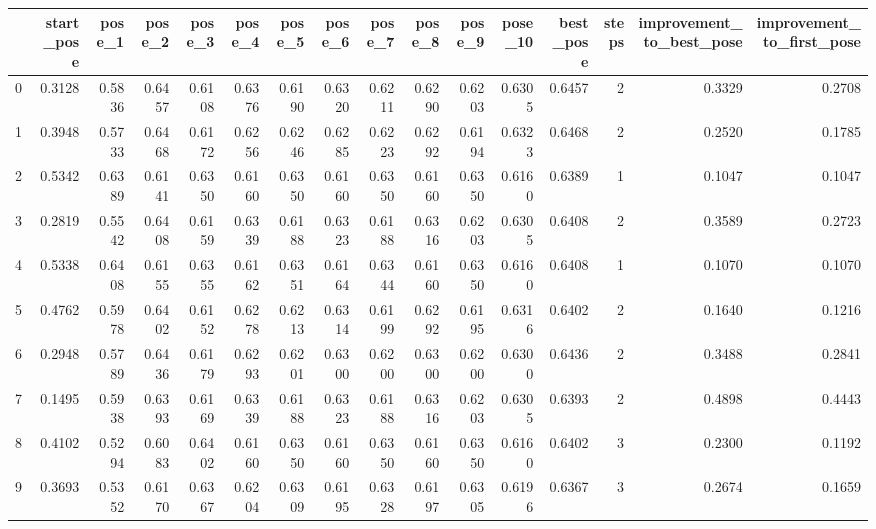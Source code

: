 \begin{tabular}{lrrrrrrrrrrrrrrr}
\toprule
{} &  start\_pose &  pose\_1 &  pose\_2 &  pose\_3 &  pose\_4 &  pose\_5 &  pose\_6 &  pose\_7 &  pose\_8 &  pose\_9 &  pose\_10 &  best\_pose &  steps &  improvement\_to\_best\_pose &  improvement\_to\_first\_pose \\
\midrule
0   &      0.3128 &  0.5836 &  0.6457 &  0.6108 &  0.6376 &  0.6190 &  0.6320 &  0.6211 &  0.6290 &  0.6203 &   0.6305 &     0.6457 &      2 &                    0.3329 &                     0.2708 \\
1   &      0.3948 &  0.5733 &  0.6468 &  0.6172 &  0.6256 &  0.6246 &  0.6285 &  0.6223 &  0.6292 &  0.6194 &   0.6323 &     0.6468 &      2 &                    0.2520 &                     0.1785 \\
2   &      0.5342 &  0.6389 &  0.6141 &  0.6350 &  0.6160 &  0.6350 &  0.6160 &  0.6350 &  0.6160 &  0.6350 &   0.6160 &     0.6389 &      1 &                    0.1047 &                     0.1047 \\
3   &      0.2819 &  0.5542 &  0.6408 &  0.6159 &  0.6339 &  0.6188 &  0.6323 &  0.6188 &  0.6316 &  0.6203 &   0.6305 &     0.6408 &      2 &                    0.3589 &                     0.2723 \\
4   &      0.5338 &  0.6408 &  0.6155 &  0.6355 &  0.6162 &  0.6351 &  0.6164 &  0.6344 &  0.6160 &  0.6350 &   0.6160 &     0.6408 &      1 &                    0.1070 &                     0.1070 \\
5   &      0.4762 &  0.5978 &  0.6402 &  0.6152 &  0.6278 &  0.6213 &  0.6314 &  0.6199 &  0.6292 &  0.6195 &   0.6316 &     0.6402 &      2 &                    0.1640 &                     0.1216 \\
6   &      0.2948 &  0.5789 &  0.6436 &  0.6179 &  0.6293 &  0.6201 &  0.6300 &  0.6200 &  0.6300 &  0.6200 &   0.6300 &     0.6436 &      2 &                    0.3488 &                     0.2841 \\
7   &      0.1495 &  0.5938 &  0.6393 &  0.6169 &  0.6339 &  0.6188 &  0.6323 &  0.6188 &  0.6316 &  0.6203 &   0.6305 &     0.6393 &      2 &                    0.4898 &                     0.4443 \\
8   &      0.4102 &  0.5294 &  0.6083 &  0.6402 &  0.6160 &  0.6350 &  0.6160 &  0.6350 &  0.6160 &  0.6350 &   0.6160 &     0.6402 &      3 &                    0.2300 &                     0.1192 \\
9   &      0.3693 &  0.5352 &  0.6170 &  0.6367 &  0.6204 &  0.6309 &  0.6195 &  0.6328 &  0.6197 &  0.6305 &   0.6196 &     0.6367 &      3 &                    0.2674 &                     0.1659 \\

\end{tabular}
